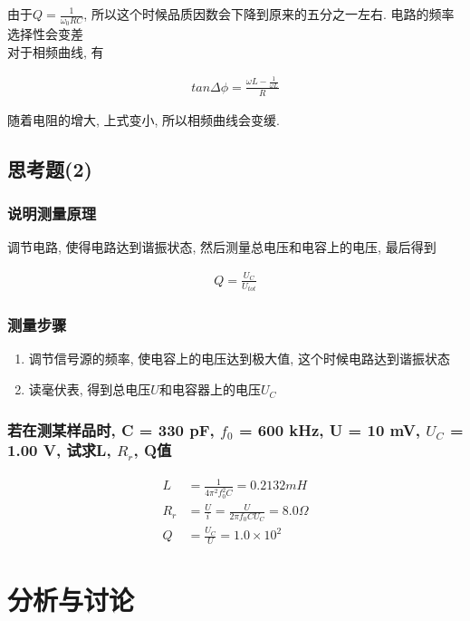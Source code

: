 \documentclass[a4paper,12pt,notitlepage]{article}
\begin{document}
	由于$Q = \frac{1}{\omega_0 RC}$, 所以这个时候品质因数会下降到原来的五分之一左右. 电路的频率选择性会变差 \\
	
	对于相频曲线, 有
	
\begin{align*}
	tan\Delta\phi = \frac{\omega L - \frac{1}{\omega L}}{R}
\end{align*}

	随着电阻的增大, 上式变小, 所以相频曲线会变缓.
	
\subsection{思考题(2)}

\subsubsection{说明测量原理}

	调节电路, 使得电路达到谐振状态, 然后测量总电压和电容上的电压, 最后得到
	
\begin{align*}
	Q = \frac{U_C}{U_{tot}}
\end{align*}

\subsubsection{测量步骤}

\begin{enumerate}
	\item 调节信号源的频率, 使电容上的电压达到极大值, 这个时候电路达到谐振状态
	\item 读毫伏表, 得到总电压$U$和电容器上的电压$U_C$
\end{enumerate}

\subsubsection{若在测某样品时, C = 330 pF, $f_0$ = 600 kHz, U = 10 mV, $U_C$ = 1.00 V, 试求L, $R_r$, Q值}

\begin{align*}
	L &= \frac{1}{4\pi^2f_0^2C} = 0.2132mH \\
	R_r &= \frac{U}{i} = \frac{U}{2\pi f_0CU_C} = 8.0\Omega \\
	Q &= \frac{U_C}{U} = 1.0 \times 10^2
\end{align*}

\section{分析与讨论}
\end{document}
